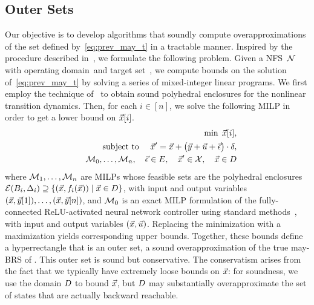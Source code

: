 \documentclass[letterpaper, 10 pt, conference]{ieeeconf}  %
\begin{document}
\subsection{Outer Sets}
Our objective is to develop algorithms that soundly compute overapproximations of the set defined by~\eqref{eq:prev_may_t} in a tractable manner.
Inspired by the procedure described in~\cite{rober2023backward}, we formulate
the following problem. Given a NFS~$\mathcal{N}$ with operating domain~\dom and target
set~\stateset, we compute bounds on the solution
of~\eqref{eq:prev_may_t} by solving a series of mixed-integer linear programs.
We first employ the technique of~\cite{akinwande2025verifying} to obtain sound polyhedral enclosures for the nonlinear transition dynamics.
Then, for each $i \in [n]$, we solve the following MILP in order to get a lower
bound on $\vec{x}[i]$.
\begin{subequations}
\begin{align}
    \min \; \vec{x}[i], \\
    \text{subject to } 
    \quad \vec{x}' = \vec{x} + \big(\vec{y} + \vec{u} + \vec{\epsilon}\big)\cdot\delta, \\
    \quad \mathcal{M}_0,\dots,\mathcal{M}_n, \quad
    \vec{\epsilon} \in E, \quad
    \vec{x}' \in \mathcal{X}, \quad
    \vec{x} \in D
\end{align}

\label{eq:bw_Reach_outer}
\end{subequations}
\noindent
where $\mathcal{M}_1,\dots,\mathcal{M}_n$ are MILPs whose feasible sets are the polyhedral enclosures $\mathcal{E}(B_i,\Delta_i) \supseteq \{(\vec{x},f_i(\vec{x})) \mid \vec{x} \in D\}$, with input and output variables $(\vec{x},\vec{y}[1]), \dots, (\vec{x},\vec{y}[n])$, and $\mathcal{M}_0$ is an exact MILP formulation of the fully-connected ReLU-activated neural network controller using standard methods~\cite{tjeng2017evaluating}, with input and output variables $(\vec{x},\vec{u})$. Replacing the minimization with a maximization yields corresponding upper bounds. Together, these bounds define a hyperrectangle that is an outer set, a sound overapproximation of the true may-BRS of \stateset.
This outer set is sound but conservative. The conservatism arises from the fact that we typically have extremely loose bounds on $\vec{x}$: for soundness, we use the domain $D$ to bound $\vec{x}$, but $D$ may substantially overapproximate the set of states that are actually backward reachable.%
\end{document}

